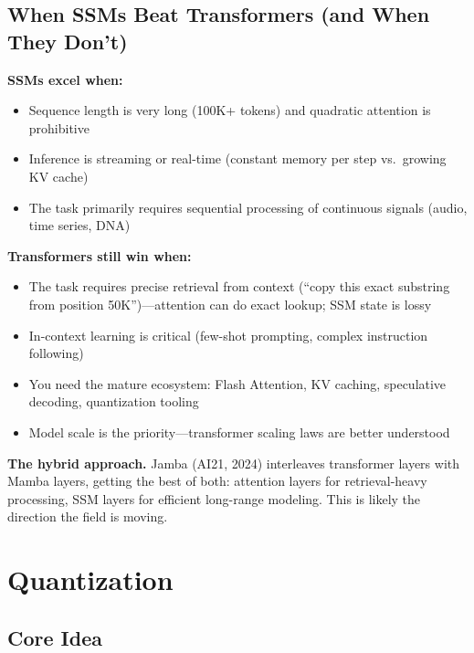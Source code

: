 \subsection{When SSMs Beat Transformers (and When They Don't)}

\textbf{SSMs excel when:}
\begin{itemize}
    \item Sequence length is very long (100K+ tokens) and quadratic attention is prohibitive
    \item Inference is streaming or real-time (constant memory per step vs.\ growing KV cache)
    \item The task primarily requires sequential processing of continuous signals (audio, time series, DNA)
\end{itemize}

\textbf{Transformers still win when:}
\begin{itemize}
    \item The task requires precise retrieval from context (``copy this exact substring from position 50K'')---attention can do exact lookup; SSM state is lossy
    \item In-context learning is critical (few-shot prompting, complex instruction following)
    \item You need the mature ecosystem: Flash Attention, KV caching, speculative decoding, quantization tooling
    \item Model scale is the priority---transformer scaling laws are better understood
\end{itemize}

\textbf{The hybrid approach.} Jamba (AI21, 2024) interleaves transformer layers with Mamba layers, getting the best of both: attention layers for retrieval-heavy processing, SSM layers for efficient long-range modeling. This is likely the direction the field is moving.

\section{Quantization}
\label{sec:quantization}

\subsection{Core Idea}

